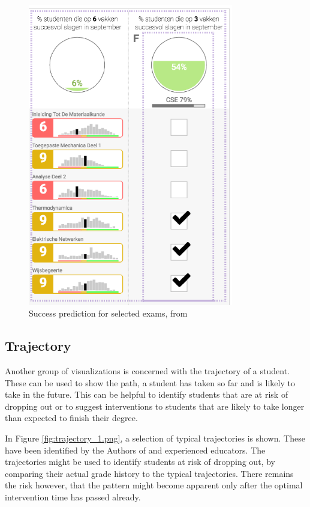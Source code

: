 \begin{figure}
    \centering
    \includegraphics[width=0.8\textwidth]{figures/success_2.png}
    \caption{Success prediction for selected exams, from \cite{LISSA}}
    \label{fig:succes_2.png}
\end{figure}

\subsection{Trajectory}
\label{subsec:trajectory}

Another group of visualizations is concerned with the trajectory of a student.
These can be used to show the path, a student has taken so far and is likely to take in the future. This can be helpful to identify students that are at risk of dropping out or to suggest interventions to students that are likely to take longer than expected to finish their degree.

In Figure \ref{fig:trajectory_1.png}, a selection of typical trajectories is shown.
These have been identified by the Authors of \cite{DegreePictures-Seed} and experienced educators.
The trajectories might be used to identify students at risk of dropping out, by comparing their actual grade history to the typical trajectories. There remains the risk however, that the pattern might become apparent only after the optimal intervention time has passed already.

